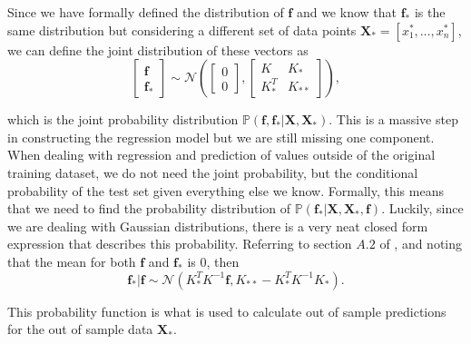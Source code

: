 Since we have formally defined the distribution of $\boldsymbol{f}$ and we know that $\boldsymbol{f}_*$ is the same distribution but considering a different set of data points $\boldsymbol{X}_* = [x^*_1, \ldots, x^*_n]$, we can define the joint distribution of these vectors as 
\[ \begin{bmatrix}
	\boldsymbol{f} \\
	\boldsymbol{f}_*
\end{bmatrix} \sim \mathcal{N}\left( \begin{bmatrix}
0 \\
0
\end{bmatrix} , \begin{bmatrix}
K & K_* \\
K_*^T & K_{**}
\end{bmatrix} \right), 
\]

which is the joint probability distribution $\mathbb{P}(\boldsymbol{f}, \boldsymbol{f}_* | \boldsymbol{X}, \boldsymbol{X}_*)$. This is a massive step in constructing the regression model but we are still missing one component. When dealing with regression and prediction of values outside of the original training dataset, we do not need the joint probability, but the conditional probability of the test set given everything else we know. Formally, this means that we need to find the probability distribution of $\mathbb{P}(\boldsymbol{f}_* | \boldsymbol{X}, \boldsymbol{X}_*, \boldsymbol{f})$. Luckily, since we are dealing with Gaussian distributions, there is a very neat closed form expression that describes this probability. Referring to section $A.2$ of \cite{rasmussen2006gaussian}, and noting that the mean for both $\boldsymbol{f}$ and $\boldsymbol{f}_*$ is 0, then 
\[ \boldsymbol{f}_* | \boldsymbol{f} \sim \mathcal{N}(K_*^T K^{-1} \boldsymbol{f}, K_{**} - K_*^T K^{-1} K_*). \]

This probability function is what is used to calculate out of sample predictions for the out of sample data $\boldsymbol{X}_*$. 
 

